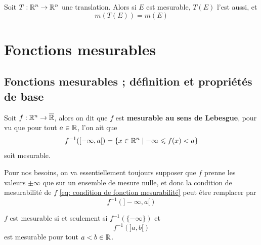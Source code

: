 \begin{theoreme} \label{thm: Invariance par translation}
	Soit $T : \mathbb{R}^n \to \mathbb{R}^n$ une translation. Alors si $E$ est mesurable, $T(E)$ l'est aussi, et
	\[
	m(T(E)) = m(E)
	\]
\end{theoreme}


\section{Fonctions mesurables}

\subsection{Fonctions mesurables ; définition et propriétés de base}
\begin{definition}
	Soit $f : \mathbb{R}^n \to \overline {\mathbb{R}}$, alors on dit que $f$ est \textbf{mesurable au sens de Lebesgue}, pour vu que pour tout $a \in \mathbb{R}$, l'on ait que
	\begin{equation} \label{eq: condition de fonction mesurabilité}
	f^{-1}([-\infty, a[) = \{ x \in \mathbb{R}^n \mid  -\infty \leqslant f(x) < a\}
	\end{equation}
	soit mesurable.
\end{definition}

\begin{remarque}
	Pour nos besoins, on va essentiellement toujours supposer que $f$ prenne les valeurs $\pm \infty$ que sur un ensemble de mesure nulle, et donc la condition de mesurabilité de $f$ \eqref{eq: condition de fonction mesurabilité} peut être remplacer par
	\[
	f^{-1}(]-\infty, a[) 
	\]
\end{remarque}

\begin{lemme} \label{lem : Caractérisation de mesurabilité}
	$f$ est mesurable si et seulement si $f^{-1} (\{-\infty\})$ et 
	\[
	f^{-1}(]a,b[)
	\]
	est mesurable pour tout $a < b \in \mathbb{R}$.
\end{lemme}

